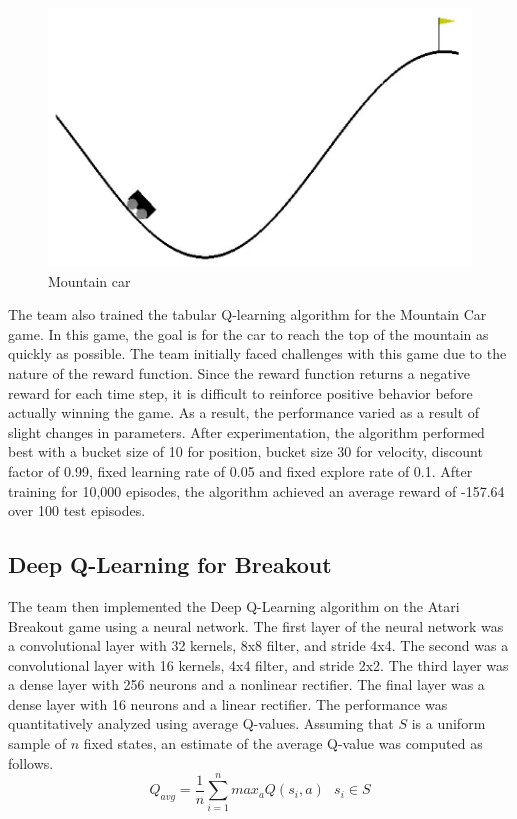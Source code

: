 \documentclass[12pt,letterpaper]{article}
\begin{document}
\begin{figure}[h!]
\centering\includegraphics[scale=0.45,clip]{mountain_car.png}
\caption{Mountain car}
\label{fig:mountain_car}
\end{figure}

The team also trained the tabular Q-learning algorithm for the Mountain Car game. In this game, the goal is for the car to reach the top of the mountain as quickly as possible. The team initially faced challenges with this game due to the nature of the reward function. Since the reward function returns a negative reward for each time step, it is difficult to reinforce positive behavior before actually winning the game. As a result, the performance varied as a result of slight changes in parameters. After experimentation, the algorithm performed best with a bucket size of 10 for position, bucket size 30 for velocity, discount factor of 0.99, fixed learning rate of 0.05 and fixed explore rate of 0.1. After training for 10,000 episodes, the algorithm achieved an average reward of -157.64 over 100 test episodes.

\subsection{Deep Q-Learning for Breakout}
The team then implemented the Deep Q-Learning algorithm on the Atari Breakout game using a neural network. The first layer of the neural network was a convolutional layer with 32 kernels, 8x8 filter, and stride 4x4. The second was a convolutional layer with 16 kernels, 4x4 filter, and stride 2x2. The third layer was a dense layer with 256 neurons and a nonlinear rectifier. The final layer was a dense layer with 16 neurons and a linear rectifier. The performance was quantitatively analyzed using average Q-values. Assuming that $S$ is a uniform sample of $n$ fixed states, an estimate of the average Q-value was computed as follows.
$$ Q_{avg} = \frac{1}{n} \sum_{i=1}^{n} max_{a} Q(s_{i},a) ~~~ s_{i} \in S$$
\end{document}
